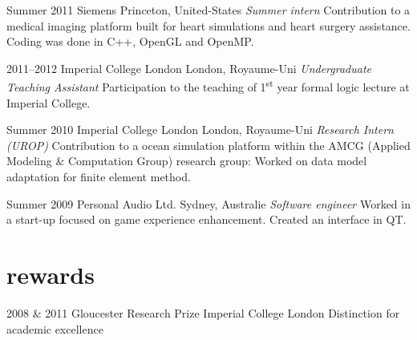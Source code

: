 \documentclass[]{friggeri-cv} %
\begin{document}
\begin{entrylist}

\entry
{Summer 2011}
{Siemens}
    {Princeton, United-States}
{\emph{Summer intern}
\medbreak
Contribution to a medical imaging platform built for heart simulations and
heart surgery assistance. Coding was done in C++, OpenGL and OpenMP.
\bigbreak
}

\entry
{2011--2012}
{Imperial College London}
{London, Royaume-Uni}
{\emph{Undergraduate Teaching Assistant}
\medbreak
    Participation to the teaching of 1\textsuperscript{st} year formal logic lecture at Imperial College.
\bigbreak
}

\entry
{Summer 2010}
{Imperial College London}
{London, Royaume-Uni}
    {\emph{Research Intern (UROP)}
	\medbreak
    Contribution to a ocean simulation platform within the AMCG (Applied Modeling \& Computation Group) research group: Worked on data model adaptation for finite element method.
	\bigbreak
}

\entry
{Summer 2009}
{Personal Audio Ltd.}
{Sydney, Australie}
    {\emph{Software engineer}
	\medbreak
    Worked in a start-up focused on game experience enhancement. Created
an interface in QT.
	\bigbreak
}


\end{entrylist}


\section{rewards}

\begin{entrylist}


\entry
{2008 \& 2011}
{Gloucester Research Prize}
{Imperial College London}
{Distinction for academic excellence}


\end{entrylist}


\end{document}
